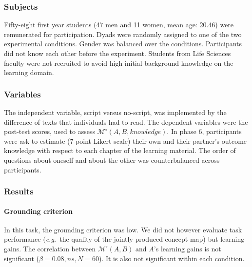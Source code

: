 \documentclass[natbib]{svjour3}
\newcommand{\eg}{{\textit{e.g.\ }}}
\newcommand{\M}[3]{{\mathcal{M}(#1, #2, #3)}}
\newcommand{\Model}[3]{{$\mathcal{M}^{\circ}(#1, #2, #3)$}}
\newcommand{\gModel}[2]{{$\mathcal{M}^{\circ}(#1, #2)$}}
\newcommand{\Mdeg}[3]{{\mathcal{M}^{\circ}(#1, #2, #3)}}
\begin{document}
\subsubsection*{Subjects}

Fifty-eight first year students (47 men and 11 women, mean age: 20.46)
were remunerated for participation. Dyads were randomly assigned to one of the
two experimental conditions. Gender was balanced over the conditions.
Participants did not know each other before the experiment. Students from Life
Sciences faculty were not recruited to avoid high initial background knowledge on the
learning domain.

\subsubsection*{Variables}

The independent variable, script versus no-script, was implemented by the
difference of texts that individuals had to read.  The dependent variables were
the post-test scores, used to assess \Model{A}{B}{knowledge}. In phase 6,
participants were ask to estimate (7-point Likert scale) their own and their
partner's outcome knowledge with respect to each chapter of the learning
material. The order of questions about oneself and about the other was
counterbalanced across participants. 
%
%
%

\subsubsection*{Results}

\paragraph{Grounding criterion} In this task, the grounding criterion was low.
We did not however evaluate task performance (\eg the quality of the jointly
produced concept map) but learning gains. The correlation between \gModel{A}{B}
and $A$'s learning gains is not significant ($\beta = 0.08, ns, N = 60$). It is
also not significant within each condition.
\end{document}
